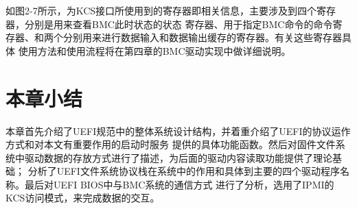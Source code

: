 如图2-7所示，为KCS接口所使用到的寄存器即相关信息，主要涉及到四个寄存器，分别是用来查看BMC此时状态的状态
寄存器、用于指定BMC命令的命令寄存器、和两个分别用来进行数据输入和数据输出缓存的寄存器。有关这些寄存器具体
使用方法和使用流程将在第四章的BMC驱动实现中做详细说明。

%
%



%
%
\section{本章小结}
本章首先介绍了UEFI规范中的整体系统设计结构，并着重介绍了UEFI的协议运作方式和对本文有重要作用的启动时服务
提供的具体功能函数。然后对固件文件系统中驱动数据的存放方式进行了描述，为后面的驱动内容读取功能提供了理论基础；
分析了UEFI文件系统协议栈在系统中的作用和具体到主要的四个驱动程序名称。最后对UEFI BIOS中与BMC系统的通信方式
进行了分析，选用了IPMI的KCS访问模式，来完成数据的交互。

\bjutclearpage